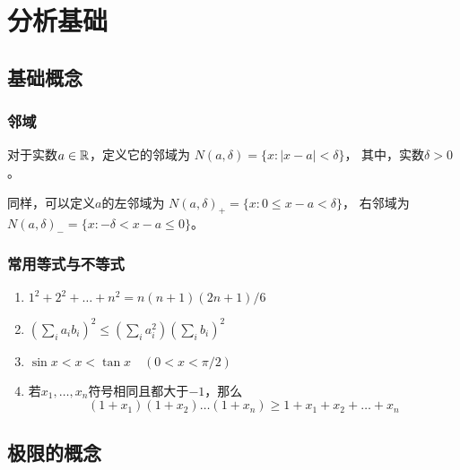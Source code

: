 \chapter{分析基础}

\section{基础概念}
\subsection{邻域}
对于实数$a\in\mathbb{R}$，定义它的邻域为
$N(a,\delta) = \{ x: |x-a| < \delta \}$，
其中，实数$\delta > 0$。

同样，可以定义$a$的左邻域为
$N(a,\delta)_+ = \{ x: 0 \le x - a < \delta \}$，
右邻域为
$N(a,\delta)_- = \{ x: -\delta < x - a \le 0  \}$。

\subsection{常用等式与不等式}
\begin{enumerate}
  \item
  $1^2+2^2+\dots +n^2 = n(n+1)(2n+1)/6$
  \item
  $(\sum_{i}a_i b_i)^2 \le (\sum_{i}a_i^2)(\sum_{i}b_i)^2$
  \item
  $\sin x < x < \tan x \quad (0 < x < \pi/2)$
  \item
  若$x_1,\dots,x_n$符号相同且都大于$-1$，那么
  \[(1+x_1)(1+x_2)\dots(1+x_n)\ge 1+x_1+x_2+\dots+x_n\]
\end{enumerate}

\section{极限的概念}